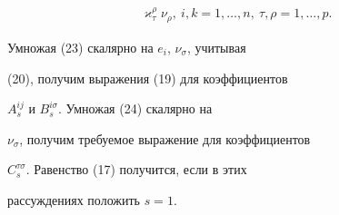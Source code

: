 \begin{pf}
\begin{equation}
\begin{split}
\varkappa^{\rho}_{\tau}\nu_{\rho}, \ i,k=1,\dotsc,n, 


\ \tau,\rho=1,\dotsc,p.


\end{split}


\end{equation}


Умножая (23) скалярно на $e_i$, $\nu_{\sigma}$, учитывая


(20), получим выражения (19) для коэффициентов


$A^{ij}_s$ и $B^{i\sigma}_s$. Умножая (24) скалярно на


$\nu_{\sigma}$, получим требуемое выражение для коэффициентов


$C^{\tau\sigma}_s$. Равенство (17) получится, если в этих


рассуждениях положить $s= 1$.


\end{pf}





